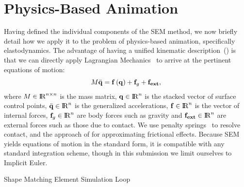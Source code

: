 \section{Physics-Based Animation}
Having defined the individual components of the SEM method, we now briefly detail how we apply it to the problem of 
physics-based animation, specifically elastodynamics. 
The advantage of having a unified kinematic description~() is that we can directly apply Lagrangian Mechanics~\cite{lanczos2012variational} to arrive at 
the pertinent equations of motion:
\begin{equation*}
    M\ddot{\mathbf{q}} = \mathbf{f}\left(\mathbf{q}\right) + \mathbf{f}_g + \mathbf{f_{ext}},
\end{equation*} where $M\in{\rm I\!R}^{n\times n}$ is the mass matrix, $\mathbf{q}\in{\rm I\!R}^{n}$ is the stacked vector of surface control points, $\ddot{\mathbf{q}}\in{\rm I\!R}^{n}$ is the generalized accelerations, $\mathbf{f}\in{\rm I\!R}^{n}$ is the 
vector of internal forces, $\mathbf{f}_g\in{\rm I\!R}^{n}$ are body forces such as gravity and $\mathbf{f_{ext}}\in{\rm I\!R}^{n}$ are external forces such as those due to contact. 
We use penalty springs~\cite{10.1145/1964921.1964932} to resolve contact, and the approach of \citet{10.1145/566654.566623} for approximating frictional effects. 
Because SEM yields equations of motion in the standard form, it is compatible with any standard integration scheme, though in this submission we limit ourselves to
Implicit Euler.

\begin{algorithm}[h]
	\begin{algorithmic}[1]
				
  			\EndFor
     	\EndWhile
	\EndProcedure
\end{algorithmic}
\caption{Shape Matching Element Simulation Loop}
\label{alg:sem_simulation}
\end{algorithm}

